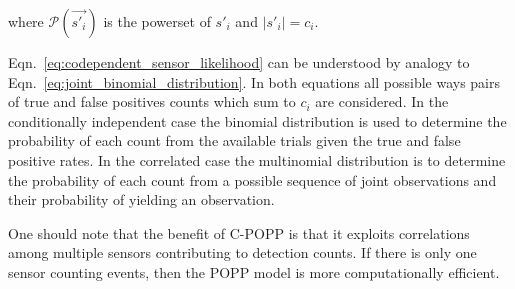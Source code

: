 \noindent where $\mathcal{P}(\vec{s'_i})$ is the powerset of $s'_i$ and $|s'_i| = c_i$.

Eqn.~\ref{eq:codependent_sensor_likelihood} can be understood by analogy to Eqn.~\ref{eq:joint_binomial_distribution}. In both equations all possible ways pairs of true and false positives counts which sum to $c_i$ are considered. In the conditionally independent case the binomial distribution is used to determine the probability of each count from the available trials given the true and false positive rates. In the correlated case the multinomial distribution is to determine the probability of each count from a possible sequence of joint observations and their probability of yielding an observation.

One should note that the benefit of C-POPP is that it exploits correlations among multiple sensors contributing to detection counts. If there is only one sensor counting events, then the POPP model is more computationally efficient.
